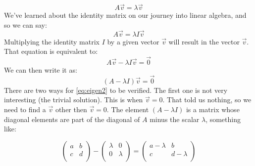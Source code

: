 \documentclass[600paper, 11pt,twoside,openany]{kdp}
\begin{document}
\[A\overrightarrow{v} = \lambda \overrightarrow{v} \]
\indent We’ve learned about the identity matrix on our journey into linear algebra, and so we can say:
\[A\overrightarrow{v} = \lambda I \overrightarrow{v}\]
\indent Multiplying the identity matrix $I$ by a given vector $\overrightarrow{v}$ will result in the vector $\overrightarrow{v}$. That equation is equivalent to:
\[A\overrightarrow{v} - \lambda I \overrightarrow{v} = \overrightarrow{0}\]
\indent We can then write it as:
\begin{equation}\label{eq:eigen2}
(A - \lambda I)\overrightarrow{v} = \overrightarrow{0}
\end{equation}
\indent There are two ways for \ref{eq:eigen2} to be verified. The first one is not very interesting (the trivial solution). This is when $\overrightarrow{v}=0$. That told us nothing, so we need to find a $\overrightarrow{v}$ other then $\overrightarrow{v}=0$. The element $(A−\lambda I)$ is a matrix whose diagonal elements are part of the diagonal of $A$ minus the scalar  $\lambda$, something like:

\[\begin{pmatrix}
a & b \\
c & d \\
\end{pmatrix} - \begin{pmatrix}
\lambda & 0 \\
0 & \lambda \\
\end{pmatrix} = \begin{pmatrix}
a - \lambda & b \\
c & d - \lambda \\
\end{pmatrix}
\]
\end{document}
